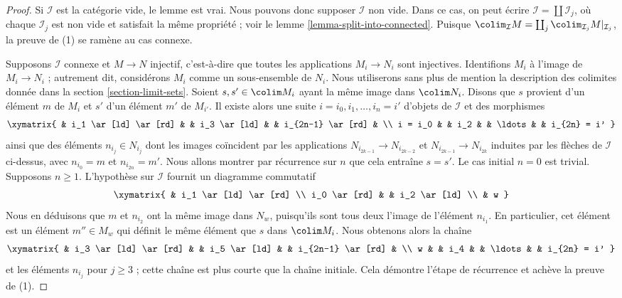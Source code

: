 \begin{proof}
Si $\mathcal{I}$ est la catégorie vide, le lemme est vrai.
Nous pouvons donc supposer $\mathcal{I}$ non vide. Dans ce cas,
on peut écrire $\mathcal{I} = \coprod \mathcal{I}_j$, où chaque
$\mathcal{I}_j$ est non vide et satisfait la même propriété ; voir le
lemme \ref{lemma-split-into-connected}. Puisque
$\colim_\mathcal{I} M = \coprod_j \colim_{\mathcal{I}_j} M|_{\mathcal{I}_j}$,
la preuve de (1) se ramène au cas connexe.

\medskip\noindent
Supposons $\mathcal{I}$ connexe et $M \to N$ injectif, c'est-à-dire
que toutes les applications $M_i \to N_i$ sont injectives.
Identifions $M_i$ à l'image de $M_i \to N_i$ ; autrement dit,
considérons $M_i$ comme un sous-ensemble de $N_i$.
Nous utiliserons sans plus de mention la description des colimites donnée
dans la section \ref{section-limit-sets}.
Soient $s, s' \in \colim M_i$ ayant la même image dans $\colim N_i$.
Disons que $s$ provient d'un élément $m$ de $M_i$ et $s'$ d'un
élément $m'$ de $M_{i'}$. Il existe alors une suite
$i = i_0, i_1, \ldots, i_n = i'$ d'objets de $\mathcal{I}$
et des morphismes
$$
\xymatrix{
&
i_1 \ar[ld] \ar[rd] & &
i_3 \ar[ld] & &
i_{2n-1} \ar[rd] & \\
i = i_0 & &
i_2 & &
\ldots & &
i_{2n} = i'
}
$$
ainsi que des éléments $n_{i_j} \in N_{i_j}$ dont les images coïncident
par les applications $N_{i_{2k-1}} \to N_{i_{2k-2}}$ et
$N_{i_{2k-1}}
\to N_{i_{2k}}$ induites par les flèches de
$\mathcal{I}$ ci-dessus, avec $n_{i_0} = m$ et $n_{i_{2n}} = m'$.
Nous allons montrer par récurrence sur $n$ que cela entraîne $s = s'$.
Le cas initial $n = 0$ est trivial. Supposons $n \geq 1$.
L'hypothèse sur $\mathcal{I}$ fournit un diagramme commutatif
$$
\xymatrix{
& i_1 \ar[ld] \ar[rd] \\
i_0 \ar[rd] & & i_2 \ar[ld] \\
& w
}
$$
Nous en déduisons que $m$ et $n_{i_2}$ ont la même image dans $N_w$,
puisqu'ils sont tous deux l'image de l'élément $n_{i_1}$.
En particulier, cet élément est un élément $m'' \in M_w$ qui
définit le même élément que $s$ dans $\colim M_i$.
Nous obtenons alors la chaîne
$$
\xymatrix{
&
i_3 \ar[ld] \ar[rd] & &
i_5 \ar[ld] & &
i_{2n-1} \ar[rd] & \\
w & &
i_4 & &
\ldots & &
i_{2n} = i'
}
$$
et les éléments $n_{i_j}$ pour $j \geq 3$ ; cette chaîne est plus courte
que la chaîne initiale. Cela démontre l'étape de récurrence et achève
la preuve de (1).


\end{proof}
